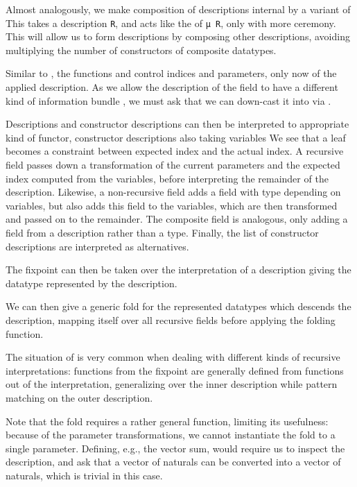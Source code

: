 Almost analogously, we make composition of descriptions internal by a variant of 
This takes a description \texttt{R}, and acts like the  of \texttt{μ R}, only with more ceremony. This will allow us to form descriptions by composing other descriptions, avoiding multiplying the number of constructors of composite datatypes.

Similar to , the functions  and  control indices and parameters, only now of the applied description. As we allow the description  of the field to have a different kind of information bundle , we must ask that we can down-cast it into  via . 

Descriptions and constructor descriptions can then be interpreted to appropriate kind of functor, constructor descriptions also taking variables
\hypertarget{desc-desc-interpretation}{}
We see that a leaf becomes a constraint between expected index and the actual index. A recursive field passes down a transformation of the current parameters and the expected index computed from the variables, before interpreting the remainder of the description. Likewise, a non-recursive field adds a field with type depending on variables, but also adds this field to the variables, which are then transformed and passed on to the remainder. The composite field is analogous, only adding a field from a description rather than a type. Finally, the list of constructor descriptions are interpreted as alternatives.

The fixpoint can then be taken over the interpretation of a description
giving the datatype represented by the description.

We can then give a generic fold for the represented datatypes
which descends the description, mapping itself over all recursive fields before applying the folding function.
\begin{remark}
    The situation of  is very common when dealing with different kinds of recursive interpretations: functions from the fixpoint are generally defined from functions out of the interpretation, generalizing over the inner description while pattern matching on the outer description. 
\end{remark}
Note that the fold requires a rather general function, limiting its usefulness: because of the parameter transformations, we cannot instantiate the fold to a single parameter. Defining, e.g., the vector sum, would require us to inspect the description, and ask that a vector of naturals can be converted into a vector of naturals, which is trivial in this case.

